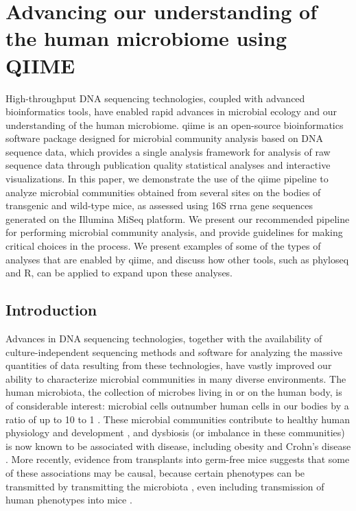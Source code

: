 \glsresetall

\section{Advancing our understanding of the human microbiome using QIIME}\label{section_book}

High-throughput DNA sequencing technologies, coupled with advanced bioinformatics
tools, have enabled rapid advances in microbial ecology and our understanding of
the human microbiome. \gls{qiime} is an open-source bioinformatics software package
designed for microbial community analysis based on DNA sequence data, which provides
a single analysis framework for analysis of raw sequence data through publication
quality statistical analyses and interactive visualizations. In this paper, we
demonstrate the use of the \gls{qiime} pipeline to analyze microbial communities
obtained from several sites on the bodies of transgenic and wild-type mice, as
assessed using 16S \gls{rrna} gene sequences generated on the Illumina MiSeq
platform. We present our recommended pipeline for performing microbial community
analysis, and provide guidelines for making critical choices in the process. We
present examples of some of the types of analyses that are enabled by \gls{qiime},
and discuss how other tools, such as phyloseq and R, can be applied to expand upon these analyses.

\subsection{Introduction}

Advances in DNA sequencing technologies, together with the availability of culture-independent
sequencing methods and software for analyzing the massive quantities of data resulting from
these technologies, have vastly improved our ability to characterize microbial communities in
many diverse environments. The human microbiota, the collection of microbes living in or on the
human body, is of considerable interest: microbial cells outnumber human cells in our bodies by
a ratio of up to 10 to 1 \cite{Savage1977}. These microbial communities contribute to healthy
human physiology \cite{DeFilippo2010, Dethlefsen2011, Spencer2011} and development
\cite{Dominguez-Bello2010, Koenig2011}, and dysbiosis (or imbalance in these communities) is now
known to be associated with disease, including obesity \cite{Turnbaugh2009Core} and Crohn's disease
\cite{Eckburg2007}. More recently, evidence from transplants into germ-free mice suggests that
some of these associations may be causal, because certain phenotypes can be transmitted by
transmitting the microbiota \cite{Carvalho2012, McLean2012, Turnbaugh2009}, even including
transmission of human phenotypes into mice \cite{Heijtz2011, Koren2012, Smith2013}.


